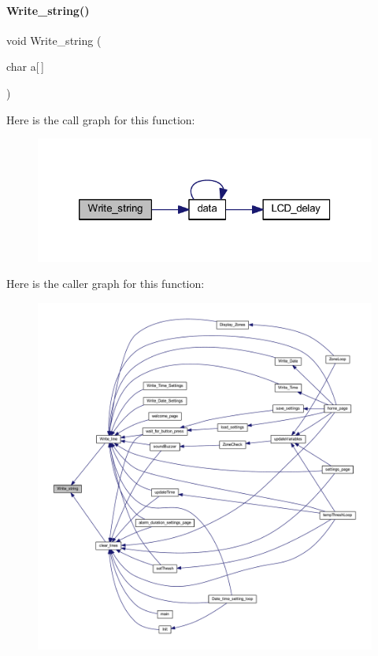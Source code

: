 \paragraph{Write\+\_\+string()}
{\footnotesize\ttfamily void Write\+\_\+string (\begin{DoxyParamCaption}\item[{char}]{a[$\,$] }\end{DoxyParamCaption})}

Here is the call graph for this function\+:
\nopagebreak
\begin{figure}[H]
\begin{center}
\leavevmode
\includegraphics[width=320pt]{a00032_ade43d0cfa2e755883a7c353a07e7ed0d_cgraph}
\end{center}
\end{figure}
Here is the caller graph for this function\+:
\nopagebreak
\begin{figure}[H]
\begin{center}
\leavevmode
\includegraphics[width=350pt]{a00032_ade43d0cfa2e755883a7c353a07e7ed0d_icgraph}
\end{center}
\end{figure}
\mbox{\label{a00032_a56e791a9efe9fd411e81433c290b733e}} 
